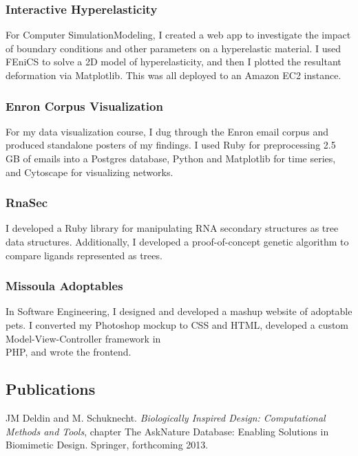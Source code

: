 \documentclass[10pt]{xecv}
\begin{document}
\begin{paracol}{2}
  \subsubsection*{Interactive Hyperelasticity}
  For Computer Simulation\amp Modeling, I created a web app to investigate the
  impact of boundary conditions and other parameters on a hyperelastic
  material. I used FEniCS to solve a 2D model of hyperelasticity, and then I
  plotted the resultant deformation via Matplotlib. This was all deployed to
  an Amazon EC2 instance.

  \subsubsection*{Enron Corpus Visualization}
  For my data visualization course, I dug through the Enron email corpus and
  produced standalone posters of my findings. I used Ruby for preprocessing
  2.5 GB of emails into a Postgres database, Python and Matplotlib for time
  series, and Cytoscape for visualizing networks.

  \subsubsection*{RnaSec}
  I developed a Ruby library for manipulating RNA secondary structures
  as tree data structures. Additionally, I developed a proof-of-concept
  genetic algorithm to compare ligands represented as trees.

  \subsubsection*{Missoula Adoptables}
  In Software Engineering, I designed and developed a mashup website of
  adoptable pets. I converted my Photoshop mockup to CSS and HTML, developed a
  custom Model-View-Controller framework in \\PHP, and wrote the frontend.

  \subsection*{Publications}
  JM Deldin and M. Schuknecht.
  \textit{Biologically Inspired Design: Computational Methods and Tools},
  chapter The AskNature Database: Enabling Solutions in Biomimetic
  Design. Springer, forthcoming 2013.
\end{paracol}
\end{document}
